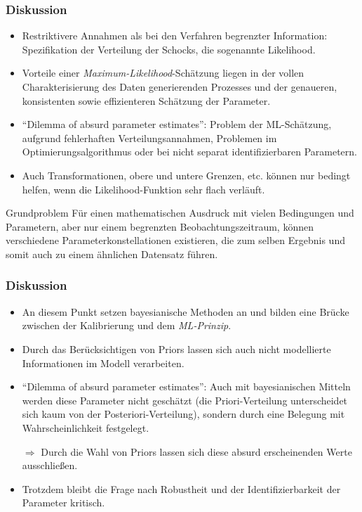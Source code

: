 \documentclass{beamer} %
\begin{document}
\begin{frame}\frametitle{Diskussion}
  \begin{itemize}
       \item Restriktivere Annahmen als bei den Verfahren begrenzter Information: Spezifikation der Verteilung der Schocks, die sogenannte Likelihood.
    \item Vorteile einer \emph{Maximum-Likelihood}-Sch\"{a}tzung liegen in der vollen Charakterisierung des Daten generierenden Prozesses und der genaueren, konsistenten sowie effizienteren Sch\"{a}tzung der Parameter.
    \item \enquote{Dilemma of absurd parameter estimates}: Problem der ML-Sch\"{a}tzung, aufgrund fehlerhaften Verteilungsannahmen, Problemen im Optimierungsalgorithmus oder bei nicht separat identifizierbaren Parametern.
    \item Auch Transformationen, obere und untere Grenzen, etc. können nur bedingt helfen, wenn die Likelihood-Funktion sehr flach verläuft.
  \end{itemize}
  \begin{block}{Grundproblem}  F\"{u}r einen mathematischen Ausdruck mit vielen Bedingungen und Parametern, aber nur einem begrenzten Beobachtungszeitraum, können verschiedene Parameterkonstellationen existieren, die zum selben Ergebnis und somit auch zu einem \"{a}hnlichen Datensatz f\"{u}hren.\end{block}

\end{frame}

\begin{frame}\frametitle{Diskussion}
  \begin{itemize}
    \item An diesem Punkt setzen bayesianische Methoden an und bilden eine Br\"{u}cke zwischen der Kalibrierung und dem \emph{ML-Prinzip}.
    \item Durch das Ber\"{u}cksichtigen von Priors lassen sich auch nicht modellierte Informationen im Modell verarbeiten.
    \item \enquote{Dilemma of absurd parameter estimates}: Auch mit bayesianischen Mitteln werden diese Parameter nicht gesch\"{a}tzt (die Priori-Verteilung unterscheidet sich kaum von der Posteriori-Verteilung), sondern durch eine Belegung mit Wahrscheinlichkeit festgelegt.
    \item[$\Rightarrow$] Durch die Wahl von Priors lassen sich diese absurd erscheinenden Werte ausschlie{\ss}en.
    \item Trotzdem bleibt die Frage nach Robustheit und der Identifizierbarkeit der Parameter kritisch.
  \end{itemize}
\end{frame}
\end{document}
